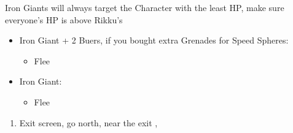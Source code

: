 \begin{encounters}
    Iron Giants will always target the Character with the least HP, make sure everyone's HP is above Rikku's
    \begin{itemize}
        \item Iron Giant + 2 Buers, if you bought extra Grenades for Speed Spheres:
        \begin{itemize}
            \switch{\tidus}{\rikku}
            \rikkuf Use Grenade
            \wakkaf Defend
            \auronf Defend
            \enemyf Attacks \rikku
            \switch{\wakka}{\tidus}
            \item Flee
        \end{itemize}
        \item Iron Giant:
        \begin{itemize}
            \tidusf Defend
            \switch{\wakka}{\rikku}
            \rikkuf Steal Light Curtain
            \auronf Defend
            \enemyf Attacks \rikku
            \item Flee
        \end{itemize}
    \end{itemize}
\end{encounters}
\begin{enumerate}[resume]
    \item Exit screen, go north, near the exit \sd, \cs[3:10]
\end{enumerate}